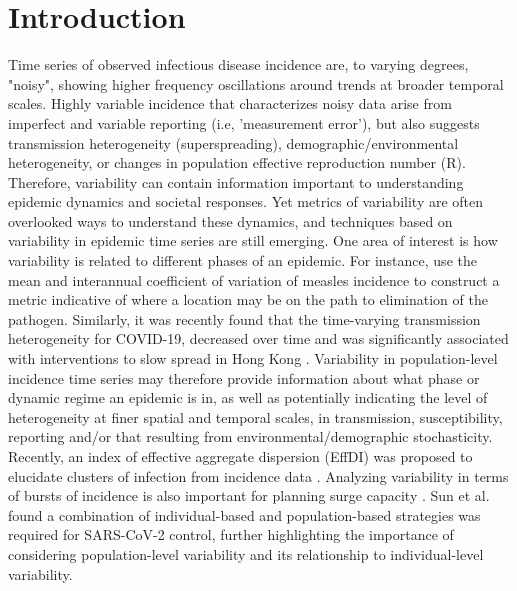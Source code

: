 \documentclass[10pt,letterpaper]{article}
\begin{document}
\section*{Introduction}
Time series of observed infectious disease incidence are, to varying degrees, "noisy", showing higher frequency oscillations around trends at broader temporal scales.
Highly variable incidence that characterizes noisy data arise from imperfect and variable reporting (i.e, 'measurement error'), but also suggests transmission heterogeneity (superspreading), demographic/environmental heterogeneity, or changes in population effective reproduction number (R).
Therefore, variability can contain information important to understanding epidemic dynamics and societal responses. 
Yet metrics of variability are often overlooked ways to understand these dynamics, and techniques based on variability in epidemic time series are still emerging. 
One area of interest is how variability is related to different phases of an epidemic. 
For instance, \cite{graham_measles_2019} use the mean and interannual coefficient of variation of measles incidence to construct a metric indicative of where a location may be on the path to elimination of the pathogen. 
Similarly, it was recently found that the time-varying transmission heterogeneity for COVID-19, decreased over time and was significantly associated with interventions to slow spread in Hong Kong \cite{adam_time-varying_2022}. 
Variability in population-level incidence time series may therefore provide information about what phase or dynamic regime an epidemic is in, as well as potentially indicating the level of heterogeneity at finer spatial and temporal scales, in transmission, susceptibility, reporting and/or that resulting from environmental/demographic stochasticity. 
Recently, an index of effective aggregate dispersion (EffDI) was proposed to elucidate clusters of infection from incidence data \cite{schneckenreither_assessing_2023}. 
Analyzing variability in terms of bursts of incidence is also important for planning surge capacity \cite{wallinga_metropolitan_2018}. 
Sun et al. \cite{sun_transmission_2021} found a combination of individual-based and population-based strategies was required for SARS-CoV-2 control, further highlighting the importance of considering population-level variability and its relationship to individual-level variability.
\end{document}
